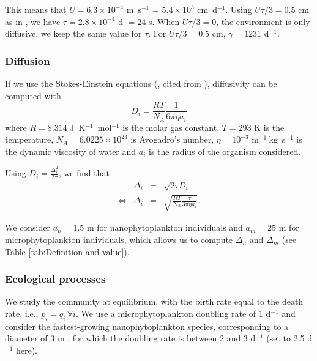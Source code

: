 \documentclass[12pt,english]{article}
\begin{document}
This means that $U=6.3\times10^{-4}$ m~s$^{-1}$ = $5.4\times10^{3}$
cm~d$^{-1}$. Using $U\tau/3=0.5$ cm as in \citet{young_reproductive_2001},
we have $\tau=2.8\times10^{-4}$ d $=24$ s. When $U\tau/3=0$, the
environment is only diffusive, we keep the same value for $\tau$.
For $U\tau/3=0.5$ cm, $\gamma=1231$ d$^{-1}$.

\subsubsection*{Diffusion}

If we use the Stokes-Einstein equations (\citealp{einstein1905molekularkinetischen},
cited from \citealp{dusenbery_2009}), diffusivity can be computed
with 
\begin{equation}
D_{i}=\frac{RT}{N_{A}}\frac{1}{6\pi\eta a_{i}}
\end{equation}
where $R=8.314$ J~K$^{-1}$~mol$^{-1}$ is the molar gas constant,
$T=293$ K is the temperature, $N_{A}=6.0225\times10^{23}$ is Avogadro's
number, $\eta=10^{-3}$ m$^{-1}~$kg~s$^{-1}$ is the dynamic viscosity
of water and $a_{i}$ is the radius of the organism considered.

Using $D_{i}=\frac{\Delta_{i}^{2}}{2\tau}$, we find that 
\begin{equation}
\begin{array}{cccc}
 & \Delta_{i} & = & \sqrt{2\tau D_{i}}\\
\Leftrightarrow & \Delta_{i} & = & \sqrt{\frac{RT}{N_{A}}\frac{\tau}{3\pi\eta a_{i}}}.
\end{array}
\end{equation}

We consider $a_{n}=1.5$ \textmu m for nanophytoplankton individuals
and $a_{m}=25$ \textmu m for microphytoplankton individuals, which
allows us to compute $\Delta_{n}$ and $\Delta_{m}$ (see Table \ref{tab:Definition-and-value}).

\subsubsection*{Ecological processes}

We study the community at equilibrium, with the birth rate equal to
the death rate, i.e., $p_{i}=q_{i}\,\forall i$. We use a microphytoplankton
doubling rate of $1$ d$^{-1}$ \citep{bissinger_predicting_2008}
and consider the fastest-growing nanophytoplankton species, corresponding
to a diameter of 3 \textmu m \citep{bec_growth_2008}, for which the
doubling rate is between 2 and 3 d$^{-1}$ (set to 2.5 d$^{-1}$ here).
\end{document}
